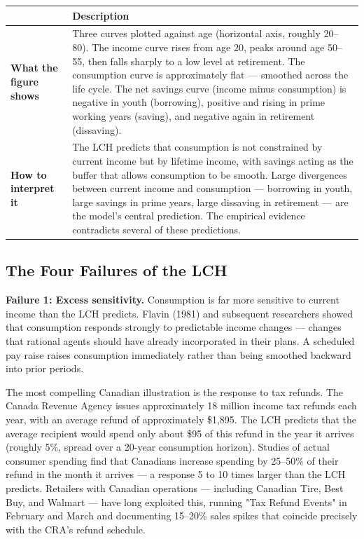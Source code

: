 \documentclass[12pt, letterpaper]{article}
\begin{document}
\begin{table}[H]
\centering
\small
\begin{tabularx}{\linewidth}{lY}
\toprule
 & Description \\
\midrule
\textbf{What the figure shows} & Three curves plotted against age (horizontal axis, roughly 20--80). The income curve rises from age 20, peaks around age 50--55, then falls sharply to a low level at retirement. The consumption curve is approximately flat --- smoothed across the life cycle. The net savings curve (income minus consumption) is negative in youth (borrowing), positive and rising in prime working years (saving), and negative again in retirement (dissaving). \\
\textbf{How to interpret it} & The LCH predicts that consumption is not constrained by current income but by lifetime income, with savings acting as the buffer that allows consumption to be smooth. Large divergences between current income and consumption --- borrowing in youth, large savings in prime years, large dissaving in retirement --- are the model's central prediction. The empirical evidence contradicts several of these predictions. \\
\bottomrule
\end{tabularx}
\end{table}



\subsection{The Four Failures of the LCH}


\textbf{Failure 1: Excess sensitivity.} Consumption is far more sensitive to current income than the LCH predicts. Flavin (1981) and subsequent researchers showed that consumption responds strongly to predictable income changes --- changes that rational agents should have already incorporated in their plans. A scheduled pay raise raises consumption immediately rather than being smoothed backward into prior periods.

The most compelling Canadian illustration is the response to tax refunds. The Canada Revenue Agency issues approximately 18 million income tax refunds each year, with an average refund of approximately \$1,895. The LCH predicts that the average recipient would spend only about \$95 of this refund in the year it arrives (roughly 5\%, spread over a 20-year consumption horizon). Studies of actual consumer spending find that Canadians increase spending by 25--50\% of their refund in the month it arrives --- a response 5 to 10 times larger than the LCH predicts. Retailers with Canadian operations --- including Canadian Tire, Best Buy, and Walmart --- have long exploited this, running "Tax Refund Events" in February and March and documenting 15--20\% sales spikes that coincide precisely with the CRA's refund schedule.
\end{document}
